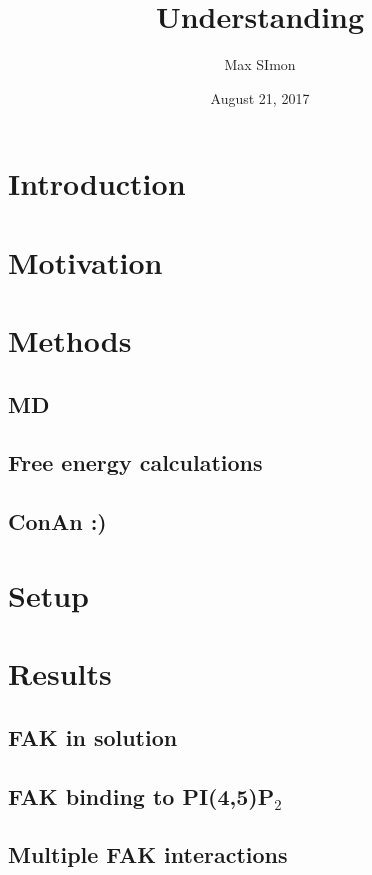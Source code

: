 \documentclass[
12pt, %
parskip=half, %
digital, %
oneside, %
]{bsc}
\title{Understanding}
\author{Max SImon}
\date{August 21, 2017}
\newcommand{\pip}{PI(4,5)P$_2$}
\begin{document}
	
\chapter{Introduction}

\chapter{Motivation}

\chapter{Methods}
\section{MD}
\section{Free energy calculations}
\section{ConAn :)}
%
%
%
\chapter{Setup}

\chapter{Results}
\section{FAK in solution}
\label{sec:fak_sol}

\section{FAK binding to \pip{}}



\section{Multiple FAK interactions}

\end{document}
